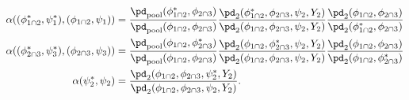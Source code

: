 \begin{align}
  \alpha((\phi_{1 \cap 2}^{*}, \psi_{1}^{*}), (\phi_{1 \cap 2}, \psi_{1})) &= 
    \frac {
      \pd_{\text{pool}}(\phi_{1 \cap 2}^{*}, \phi_{2 \cap 3})
    } {
      \pd_{\text{pool}}(\phi_{1 \cap 2}, \phi_{2 \cap 3})
    }
    \frac {
      \pd_{2}(\phi_{1 \cap 2}^{*}, \phi_{2 \cap 3}, \psi_{2}, Y_{2})
    } {
      \pd_{2}(\phi_{1 \cap 2}, \phi_{2 \cap 3}, \psi_{2}, Y_{2})
    }
    \frac {
      \pd_{2} (\phi_{1 \cap 2}, \phi_{2 \cap 3})
    } {
      \pd_{2} (\phi_{1 \cap 2}^{*}, \phi_{2 \cap 3})
    }
  \\
  \alpha((\phi_{2 \cap 3}^{*}, \psi_{3}^{*}), (\phi_{2 \cap 3}, \psi_{3})) &= 
    \frac {
      \pd_{\text{pool}}(\phi_{1 \cap 2}, \phi_{2 \cap 3}^{*})
    } {
      \pd_{\text{pool}}(\phi_{1 \cap 2}, \phi_{2 \cap 3})
    }
    \frac {
      \pd_{2}(\phi_{1 \cap 2}, \phi_{2 \cap 3}^{*}, \psi_{2}, Y_{2})
    } {
      \pd_{2}(\phi_{1 \cap 2}, \phi_{2 \cap 3}, \psi_{2}, Y_{2})
    }
    \frac {
      \pd_{2} (\phi_{1 \cap 2}, \phi_{2 \cap 3})
    } {
      \pd_{2} (\phi_{1 \cap 2}, \phi_{2 \cap 3}^{*})
    }
  \\
  \alpha(\psi_{2}^{*}, \psi_{2}) &=
    \frac {
      \pd_{2}(\phi_{1 \cap 2}, \phi_{2 \cap 3}, \psi_{2}^{*}, Y_{2})
    } {
      \pd_{2}(\phi_{1 \cap 2}, \phi_{2 \cap 3}, \psi_{2}, Y_{2})
    }.
  \label{eqn:stage-two-acceptance}
\end{align}